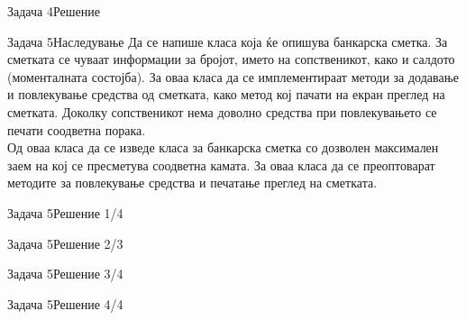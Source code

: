 \begin{frame}[fragile]{Задача 4}{Решение}

\end{frame}

\begin{frame}{Задача 5}{Наследување}
Да се напише класа која ќе опишува банкарска сметка. За сметката се чуваат
информации за бројот, името на сопственикот, како и салдото (моменталната
состојба). За оваа класа да се имплементираат методи за додавање и повлекување
средства од сметката, како метод кој пачати на екран преглед на сметката.
Доколку сопственикот нема доволно средства при повлекувањето се печати соодветна порака.\\
Од оваа класа да се изведе класа за банкарска сметка со дозволен максимален
заем на кој се пресметува соодветна камата. За оваа класа да се преоптоварат
методите за повлекување средства и печатање преглед на сметката.
\end{frame}

\begin{frame}[fragile]{Задача 5}{Решение 1/4}

\end{frame}

\begin{frame}[fragile]{Задача 5}{Решение 2/3}

\end{frame}

\begin{frame}[fragile]{Задача 5}{Решение 3/4}

\end{frame}

\begin{frame}[fragile]{Задача 5}{Решение 4/4}

\end{frame}
